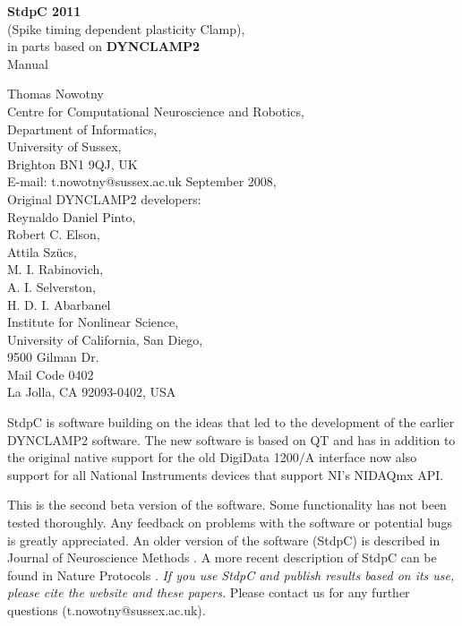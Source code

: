 \documentclass{article}
\begin{document}
\begin{titlepage}
  \begin{center}
  {{\bf \Large 
    StdpC 2011 }\\[0.3cm]
    \large (Spike timing dependent plasticity Clamp)}, \\[1cm]
  {\large 
    in parts based on {\bf DYNCLAMP2} \cite{Pinto2001} 
  } \\[2cm]
  {\sc \Large Manual }
  \end{center}
\vspace*{5cm}

\noindent
{\large Thomas Nowotny} \\[0.5cm]
Centre for Computational Neuroscience and Robotics, \\
Department of Informatics, \\
University of Sussex, \\
Brighton BN1 9QJ, UK \\
E-mail: t.nowotny@sussex.ac.uk
September 2008, \\[1cm]
Original DYNCLAMP2 developers: \\[0.2cm]
Reynaldo Daniel Pinto, \\
Robert C. Elson, \\
Attila Sz\"ucs, \\
M. I. Rabinovich, \\
A. I. Selverston,  \\
H. D. I. Abarbanel \\[0.5cm]
Institute for Nonlinear Science, \\
University of California, San Diego, \\
9500 Gilman Dr. \\ Mail Code 0402 \\
La Jolla, CA 92093-0402, USA \\

\end{titlepage}

StdpC is software building on the ideas that led
to the development of the earlier DYNCLAMP2
software. The new software is based on QT and has in addition to the
original native support for the old DigiData 1200/A interface now also
support for all National Instruments devices that support NI's NIDAQmx
API.
 
This is the second beta version of the software. Some functionality has
not been tested thoroughly. Any feedback on problems with the
software or potential bugs is greatly appreciated.  An older version
of the software (StdpC) is described in Journal of Neuroscience
Methods \cite{Nowotny2006}. A more recent description of StdpC can be
found in Nature Protocols \cite{Kemenes2011}. {\em If you use StdpC and publish results
based on its use, please cite the website and these papers.} Please
contact us for any further questions (t.nowotny@sussex.ac.uk).
\end{document}
